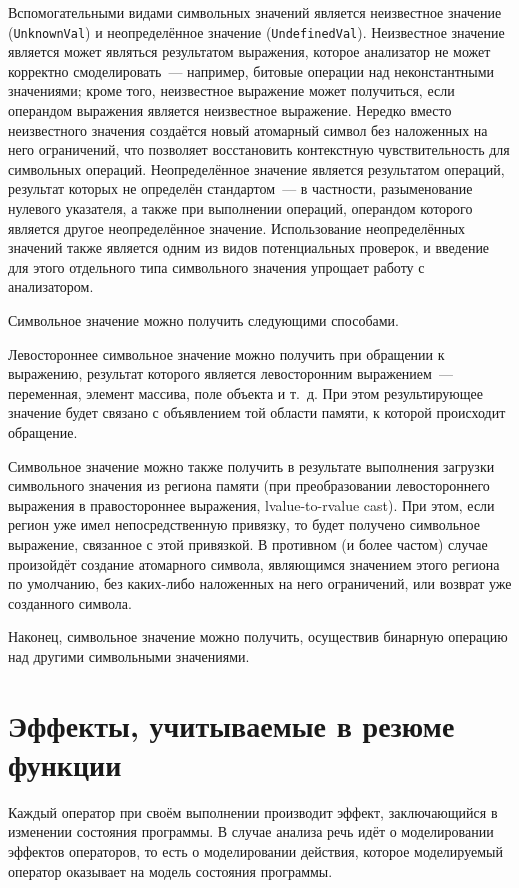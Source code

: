 Вспомогательными видами символьных значений является неизвестное значение (\texttt{UnknownVal}) и неопределённое значение (\texttt{UndefinedVal}). Неизвестное значение является может являться результатом выражения, которое анализатор не может корректно смоделировать~--- например, битовые операции над неконстантными значениями; кроме того, неизвестное выражение может получиться, если операндом выражения является неизвестное выражение. Нередко вместо неизвестного значения создаётся новый атомарный символ без наложенных на него ограничений, что позволяет восстановить контекстную чувствительность для символьных операций. Неопределённое значение является результатом операций, результат которых не определён стандартом~--- в частности, разыменование нулевого указателя, а также при выполнении операций, операндом которого является другое неопределённое значение. Использование неопределённых значений также является одним из видов потенциальных проверок, и введение для этого отдельного типа символьного значения упрощает работу с анализатором.

Символьное значение можно получить следующими способами.

Левостороннее символьное значение можно получить при обращении к выражению, результат которого является левосторонним выражением~--- переменная, элемент массива, поле объекта и т.~д. При этом результирующее значение будет связано с объявлением той области памяти, к которой происходит обращение.

Символьное значение можно также получить в результате выполнения загрузки символьного значения из региона памяти (при преобразовании левостороннего выражения в правостороннее выражения, lvalue-to-rvalue cast). При этом, если регион уже имел непосредственную привязку, то будет получено символьное выражение, связанное с этой привязкой. В противном (и более частом) случае произойдёт создание атомарного символа, являющимся значением этого региона по умолчанию, без каких-либо наложенных на него ограничений, или возврат уже созданного символа.

Наконец, символьное значение можно получить, осуществив бинарную операцию над другими символьными значениями.

\section{Эффекты, учитываемые в резюме функции}

Каждый оператор при своём выполнении производит эффект, заключающийся в изменении состояния программы. В случае анализа речь идёт о моделировании эффектов операторов, то есть о моделировании действия, которое моделируемый оператор оказывает на модель состояния программы.

